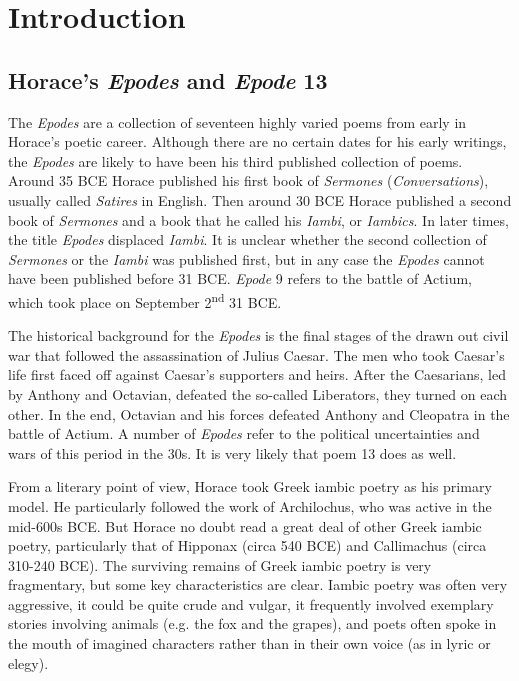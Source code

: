 \chapter*{Introduction}

\section*{Horace's \textit{Epodes} and \textit{Epode} 13}

The \textit{Epodes} are a collection of seventeen highly varied poems from early in Horace's poetic career.  Although there are no certain dates for his early writings, the \textit{Epodes} are likely to have been his third published collection of poems.  Around 35 BCE Horace published his first book of \textit{Sermones} (\textit{Conversations}), usually called \textit{Satires} in English.  Then around 30 BCE Horace published a second book of \textit{Sermones} and a book that he called his \textit{Iambi}, or \textit{Iambics}.  In later times, the title \textit{Epodes} displaced \textit{Iambi}.  It is unclear whether the second collection of \textit{Sermones} or the \textit{Iambi} was published first, but in any case the \textit{Epodes} cannot have been published before 31 BCE.  \textit{Epode} 9 refers to the battle of Actium, which took place on September 2\textsuperscript{nd} 31 BCE.

The historical background for the \textit{Epodes} is the final stages of the drawn out civil war that followed the assassination of Julius Caesar.  The men who took Caesar's life first faced off against Caesar's supporters and heirs.  After the Caesarians, led by Anthony and Octavian, defeated the so-called Liberators, they turned on each other. In the end, Octavian and his forces defeated Anthony and Cleopatra in the battle of Actium.  A number of \textit{Epodes} refer to the political uncertainties and wars of this period in the 30s.  It is very likely that poem 13 does as well.

From a literary point of view, Horace took Greek iambic poetry as his primary model.  He particularly followed the work of Archilochus, who was active in the mid-600s BCE.  But Horace no doubt read a great deal of other Greek iambic poetry, particularly that of Hipponax (circa 540 BCE) and Callimachus (circa 310-240 BCE).  The surviving remains of Greek iambic poetry is very fragmentary, but some key characteristics are clear.  Iambic poetry was often very aggressive, it could be quite crude and vulgar, it frequently involved exemplary stories involving animals (e.g. the fox and the grapes), and poets often spoke in the mouth of imagined characters rather than in their own voice (as in lyric or elegy).

